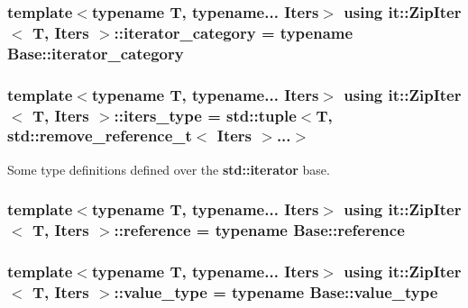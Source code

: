 \subsubsection[{\texorpdfstring{iterator\+\_\+category}{iterator_category}}]{\setlength{\rightskip}{0pt plus 5cm}template$<$typename T, typename... Iters$>$ using {\bf it\+::\+Zip\+Iter}$<$ T, Iters $>$\+::{\bf iterator\+\_\+category} =  typename Base\+::iterator\+\_\+category}\hypertarget{classit_1_1ZipIter_a0b1ee44643a34f21062bfd17c873331f}{}\label{classit_1_1ZipIter_a0b1ee44643a34f21062bfd17c873331f}
\subsubsection[{\texorpdfstring{iters\+\_\+type}{iters_type}}]{\setlength{\rightskip}{0pt plus 5cm}template$<$typename T, typename... Iters$>$ using {\bf it\+::\+Zip\+Iter}$<$ T, Iters $>$\+::{\bf iters\+\_\+type} =  {\bf std\+::tuple}$<$T, std\+::remove\+\_\+reference\+\_\+t$<$ Iters $>$...$>$}\hypertarget{classit_1_1ZipIter_abe375cba227d26df38cbf32c3229a5ed}{}\label{classit_1_1ZipIter_abe375cba227d26df38cbf32c3229a5ed}


Some type definitions defined over the {\bf std\+::iterator} base. 

\subsubsection[{\texorpdfstring{reference}{reference}}]{\setlength{\rightskip}{0pt plus 5cm}template$<$typename T, typename... Iters$>$ using {\bf it\+::\+Zip\+Iter}$<$ T, Iters $>$\+::{\bf reference} =  typename Base\+::reference}\hypertarget{classit_1_1ZipIter_a2c1a275bc7c04e1ab4d7827024fc6c19}{}\label{classit_1_1ZipIter_a2c1a275bc7c04e1ab4d7827024fc6c19}
\subsubsection[{\texorpdfstring{value\+\_\+type}{value_type}}]{\setlength{\rightskip}{0pt plus 5cm}template$<$typename T, typename... Iters$>$ using {\bf it\+::\+Zip\+Iter}$<$ T, Iters $>$\+::{\bf value\+\_\+type} =  typename Base\+::value\+\_\+type}\hypertarget{classit_1_1ZipIter_a053b769492752c329d349083f36d0380}{}\label{classit_1_1ZipIter_a053b769492752c329d349083f36d0380}


